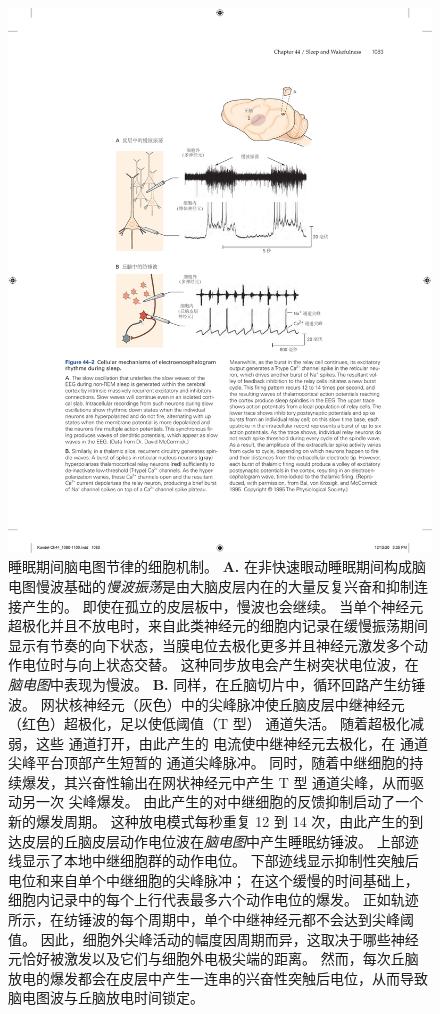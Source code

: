 \begin{figure}[htbp]
	\centering
	\includegraphics[width=0.9\linewidth]{chap44/fig_44_2}
	\caption{睡眠期间脑电图节律的细胞机制。
		\textbf{A.} 在非快速眼动睡眠期间构成脑电图慢波基础的\textit{慢波振荡}是由大脑皮层内在的大量反复兴奋和抑制连接产生的。
		即使在孤立的皮层板中，慢波也会继续。
		当单个神经元超极化并且不放电时，来自此类神经元的细胞内记录在缓慢振荡期间显示有节奏的向下状态，当膜电位去极化更多并且神经元激发多个动作电位时与向上状态交替。
		这种同步放电会产生树突状电位波，在\textit{脑电图}中表现为慢波。
		\textbf{B.} 同样，在丘脑切片中，循环回路产生纺锤波。
		网状核神经元（灰色）中的尖峰脉冲使丘脑皮层中继神经元（红色）超极化，足以使低阈值（T 型） 通道失活。
		随着超极化减弱，这些  通道打开，由此产生的  电流使中继神经元去极化，在  通道尖峰平台顶部产生短暂的  通道尖峰脉冲。
		同时，随着中继细胞的持续爆发，其兴奋性输出在网状神经元中产生 T 型  通道尖峰，从而驱动另一次  尖峰爆发。
		由此产生的对中继细胞的反馈抑制启动了一个新的爆发周期。
		这种放电模式每秒重复 12 到 14 次，由此产生的到达皮层的丘脑皮层动作电位波在\textit{脑电图}中产生睡眠纺锤波。
		上部迹线显示了本地中继细胞群的动作电位。
		下部迹线显示抑制性突触后电位和来自单个中继细胞的尖峰脉冲； 在这个缓慢的时间基础上，细胞内记录中的每个上行代表最多六个动作电位的爆发。
		正如轨迹所示，在纺锤波的每个周期中，单个中继神经元都不会达到尖峰阈值。
		因此，细胞外尖峰活动的幅度因周期而异，这取决于哪些神经元恰好被激发以及它们与细胞外电极尖端的距离。
		然而，每次丘脑放电的爆发都会在皮层中产生一连串的兴奋性突触后电位，从而导致脑电图波与丘脑放电时间锁定\cite{bal1995synaptic}。}
	\label{fig:44_2}
\end{figure}


